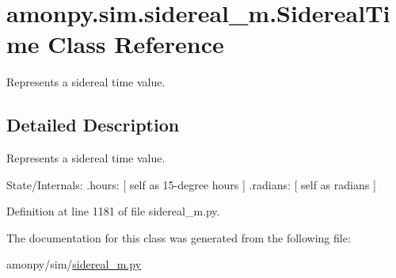 \hypertarget{classamonpy_1_1sim_1_1sidereal__m_1_1_sidereal_time}{\section{amonpy.\-sim.\-sidereal\-\_\-m.\-Sidereal\-Time Class Reference}
\label{classamonpy_1_1sim_1_1sidereal__m_1_1_sidereal_time}
}


Represents a sidereal time value.  




\subsection{Detailed Description}
Represents a sidereal time value. 

State/\-Internals\-: .hours\-: \mbox{[} self as 15-\/degree hours \mbox{]} .radians\-: \mbox{[} self as radians \mbox{]} 

Definition at line 1181 of file sidereal\-\_\-m.\-py.



The documentation for this class was generated from the following file\-:\begin{DoxyCompactItemize}
\item 
amonpy/sim/\hyperlink{sidereal__m_8py}{sidereal\-\_\-m.\-py}\end{DoxyCompactItemize}
